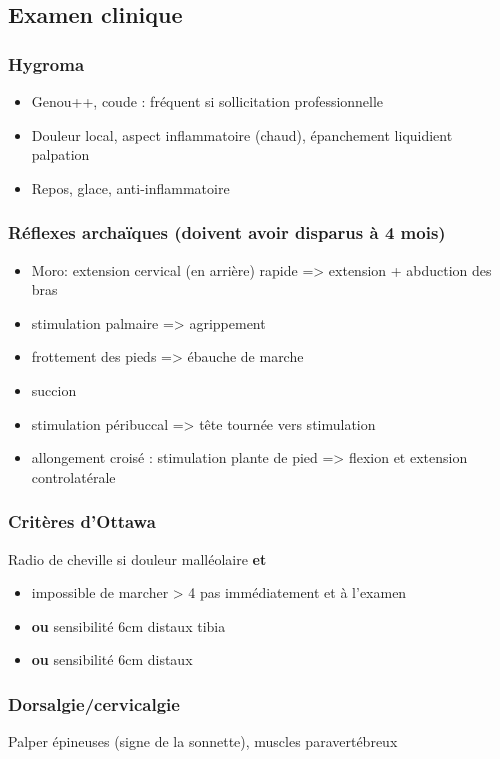 \documentclass[11pt]{article}
\begin{document}
\subsection{Examen clinique}
\label{sec:org48c04d0}
\subsubsection{Hygroma}
\label{sec:orge8a56dd}
\begin{itemize}
\item Genou++, coude : fréquent si sollicitation professionnelle
\item Douleur local, aspect inflammatoire (chaud), épanchement liquidient palpation
\item Repos, glace, anti-inflammatoire
\end{itemize}
\subsubsection{Réflexes archaïques (doivent avoir disparus à 4 mois)}
\label{sec:org5027dc7}
\begin{itemize}
\item Moro: extension cervical (en arrière) rapide => extension + abduction des bras
\item stimulation palmaire => agrippement
\item frottement des pieds => ébauche de marche
\item succion
\item stimulation péribuccal => tête tournée vers stimulation
\item allongement croisé : stimulation plante de pied => flexion et extension controlatérale
\end{itemize}
\subsubsection{Critères d'Ottawa}
\label{sec:org801aa04}
Radio de cheville si douleur malléolaire \textbf{et}
\begin{itemize}
\item impossible de marcher > 4 pas immédiatement et à l'examen
\item \textbf{ou} sensibilité 6cm distaux tibia
\item \textbf{ou} sensibilité 6cm distaux
\end{itemize}
\subsubsection{Dorsalgie/cervicalgie}
\label{sec:orgc7de25b}
Palper épineuses (signe de la sonnette), muscles paravertébreux
\end{document}

